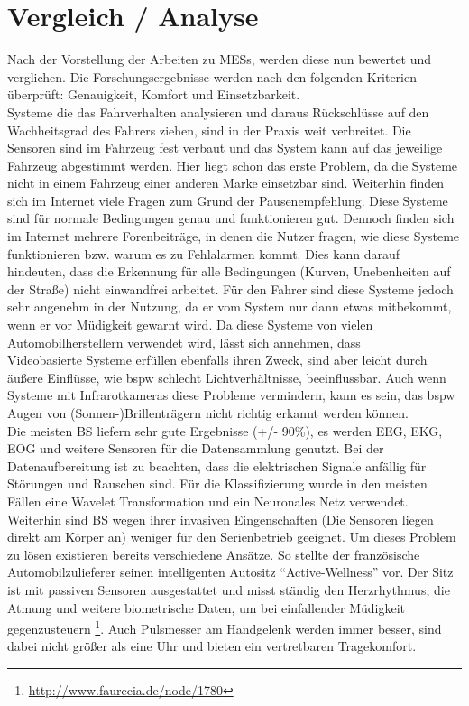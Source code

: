 {\section{Vergleich / Analyse}
\label{chap:an}
Nach der Vorstellung der Arbeiten zu \acl{MESs}, werden diese nun bewertet und verglichen. Die Forschungsergebnisse werden nach den folgenden Kriterien überprüft: Genauigkeit, Komfort und Einsetzbarkeit.\\

Systeme die das Fahrverhalten analysieren und daraus Rückschlüsse auf den Wachheitsgrad des Fahrers ziehen, sind in der Praxis weit verbreitet. Die Sensoren sind im Fahrzeug fest verbaut und das System kann auf das jeweilige Fahrzeug abgestimmt werden. Hier liegt schon das erste Problem, da die Systeme nicht in einem Fahrzeug einer anderen Marke einsetzbar sind. Weiterhin finden sich im Internet viele Fragen zum Grund der Pausenempfehlung. Diese Systeme sind für normale Bedingungen genau und funktionieren gut. Dennoch finden sich im Internet mehrere Forenbeiträge, in denen die Nutzer fragen, wie diese Systeme funktionieren bzw. warum es zu Fehlalarmen kommt. Dies kann darauf hindeuten, dass die Erkennung für alle Bedingungen (Kurven, Unebenheiten auf der Straße) nicht einwandfrei arbeitet. Für den Fahrer sind diese Systeme jedoch sehr angenehm in der Nutzung, da er vom System nur dann etwas mitbekommt, wenn er vor Müdigkeit gewarnt wird. Da diese Systeme von vielen Automobilherstellern verwendet wird, lässt sich annehmen, dass \\

Videobasierte Systeme erfüllen ebenfalls ihren Zweck, sind aber leicht durch äußere Einflüsse, wie \acl{bspw} schlecht Lichtverhältnisse, beeinflussbar. Auch wenn Systeme mit Infrarotkameras diese Probleme vermindern, kann es sein, das \acl{bspw} Augen von (Sonnen-)Brillenträgern nicht richtig erkannt werden können.\\

Die meisten \acl{BS} liefern sehr gute Ergebnisse (+/- 90\%), es werden EEG, EKG, EOG und weitere Sensoren für die Datensammlung genutzt. Bei der Datenaufbereitung ist zu beachten, dass die elektrischen Signale anfällig für Störungen und Rauschen sind. Für die Klassifizierung wurde in den meisten Fällen eine Wavelet Transformation und ein Neuronales Netz verwendet. Weiterhin sind \acl{BS} wegen ihrer invasiven Eingenschaften (Die Sensoren liegen direkt am Körper an) weniger für den Serienbetrieb geeignet. Um dieses Problem zu lösen existieren bereits verschiedene Ansätze. So stellte der französische Automobilzulieferer seinen intelligenten Autositz "`Active-Wellness"' vor. Der Sitz ist mit passiven Sensoren ausgestattet und misst ständig den Herzrhythmus, die Atmung und weitere biometrische Daten, um bei einfallender Müdigkeit gegenzusteuern \footnote{\url{http://www.faurecia.de/node/1780}}. Auch Pulsmesser am Handgelenk werden immer besser, sind dabei nicht größer als eine Uhr und bieten ein vertretbaren Tragekomfort. \\

}
